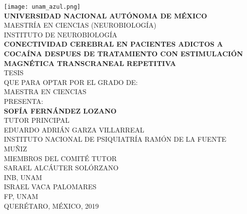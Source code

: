\begin{titlepage}
    \begin{center}
        \texttt{[image: unam\_azul.png]}\\
        \textbf{UNIVERSIDAD NACIONAL AUTÓNOMA DE MÉXICO}\\
        MAESTRÍA EN CIENCIAS (NEUROBIOLOGÍA)\\
        INSTITUTO DE NEUROBIOLOGÍA\\
        \vspace{10mm}
        \large
        \textbf{CONECTIVIDAD CEREBRAL EN PACIENTES ADICTOS A COCAÍNA DESPUES DE TRATAMIENTO CON ESTIMULACIÓN MAGNÉTICA TRANSCRANEAL REPETITIVA}\\
        \vspace{10mm}
        \large
        TESIS\\
        \normalsize
        QUE PARA OPTAR POR EL GRADO DE:\\
        MAESTRA EN CIENCIAS\\
        \vspace{10mm}
        PRESENTA:\\
        \large
        \textbf{SOFÍA FERNÁNDEZ LOZANO}\\
        \vfill
        \normalsize
        TUTOR PRINCIPAL\\
        EDUARDO ADRIÁN GARZA VILLARREAL\\
        INSTITUTO NACIONAL DE PSIQUIATRÍA RAMÓN DE LA FUENTE MUÑIZ\\
        \vspace{3mm}
        MIEMBROS DEL COMITÉ TUTOR\\
        SARAEL ALCÁUTER SOLÓRZANO\\
        INB, UNAM\\
        \vspace{1mm}
        ISRAEL VACA PALOMARES\\
        FP, UNAM\\
        \vspace{5mm}
        QUERÉTARO, MÉXICO, 2019
    \end{center}
\end{titlepage}

